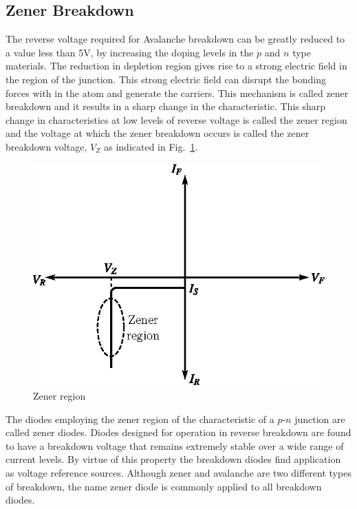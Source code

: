 \subsection{Zener Breakdown}\label{sec1.22.2}

The reverse voltage required for  Avalanche breakdown can be greatly reduced to a value less than 5V, by increasing the doping levels in the $p$ and $n$ type materials. The reduction in depletion region gives rise to a strong electric field in the region of the junction. This strong electric field can disrupt the bonding forces with in the atom and generate the carriers. This mechanism is called zener breakdown and it results in a sharp change in the characteristic. This sharp change in characteristics at low levels of reverse voltage is called the zener region and the voltage at which the zener breakdown occurs is called the zener breakdown voltage, $V_{Z}$ as indicated in Fig.~\ref{fig1.26}.
\begin{figure}[H]
\centering
\includegraphics[scale=.9]{chap1/fig1.26.eps}
\caption{Zener region}\label{fig1.26}
\end{figure}

The diodes employing the zener region of the characteristic of a $p$-$n$ junction are called zener diodes. Diodes designed for operation in reverse breakdown are found to have a breakdown voltage that remains extremely stable over a wide range of current levels. By virtue of this property the breakdown diodes find application as voltage reference sources. Although zener and avalanche are two different types of breakdown, the name zener diode is commonly applied to all breakdown diodes.\\[-22pt]

